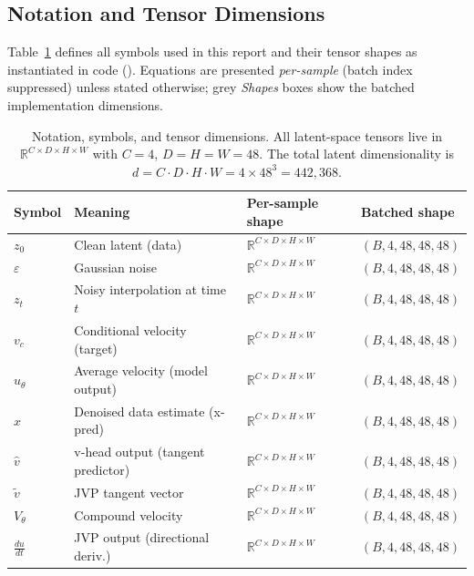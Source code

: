 \subsection{Notation and Tensor Dimensions}
\label{sec:notation}

Table~\ref{tab:notation} defines all symbols used in this report and their
tensor shapes as instantiated in code ().  Equations are
presented \emph{per-sample} (batch index suppressed) unless stated otherwise;
grey \emph{Shapes} boxes show the batched implementation dimensions.

\begin{table}[ht]
\centering
\caption{Notation, symbols, and tensor dimensions.  All latent-space tensors
live in $\mathbb{R}^{C \times D \times H \times W}$ with $C{=}4$,
$D{=}H{=}W{=}48$.  The total latent dimensionality is
$d = C \cdot D \cdot H \cdot W = 4 \times 48^3 = 442{,}368$.}
\label{tab:notation}
\small
\begin{tabular}{llll}
\toprule
\textbf{Symbol} & \textbf{Meaning} & \textbf{Per-sample shape} & \textbf{Batched shape} \\
\midrule
$z_0$ & Clean latent (data) & $\mathbb{R}^{C \times D \times H \times W}$ & $(B, 4, 48, 48, 48)$ \\
$\varepsilon$ & Gaussian noise & $\mathbb{R}^{C \times D \times H \times W}$ & $(B, 4, 48, 48, 48)$ \\
$z_t$ & Noisy interpolation at time $t$ & $\mathbb{R}^{C \times D \times H \times W}$ & $(B, 4, 48, 48, 48)$ \\
$v_c$ & Conditional velocity (target) & $\mathbb{R}^{C \times D \times H \times W}$ & $(B, 4, 48, 48, 48)$ \\
$u_\theta$ & Average velocity (model output) & $\mathbb{R}^{C \times D \times H \times W}$ & $(B, 4, 48, 48, 48)$ \\
$\hat{x}$ & Denoised data estimate (x-pred) & $\mathbb{R}^{C \times D \times H \times W}$ & $(B, 4, 48, 48, 48)$ \\
$\hat{v}$ & v-head output (tangent predictor) & $\mathbb{R}^{C \times D \times H \times W}$ & $(B, 4, 48, 48, 48)$ \\
$\tilde{v}$ & JVP tangent vector & $\mathbb{R}^{C \times D \times H \times W}$ & $(B, 4, 48, 48, 48)$ \\
$V_\theta$ & Compound velocity & $\mathbb{R}^{C \times D \times H \times W}$ & $(B, 4, 48, 48, 48)$ \\
$\frac{du}{dt}$ & JVP output (directional deriv.) & $\mathbb{R}^{C \times D \times H \times W}$ & $(B, 4, 48, 48, 48)$ \\

\end{tabular}
\end{table}
